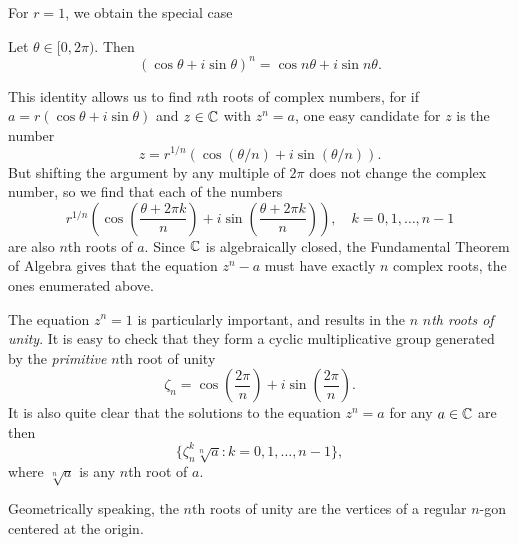 For $r=1$, we obtain the special case
\begin{proposition}
	\label{prop:de-moivre}
	Let $\theta \in [0,2\pi)$. Then $$(\cos \theta+i \sin \theta)^n=\cos n\theta+i \sin n \theta.$$
\end{proposition}

This identity allows us to find $n$th roots of complex numbers, for if $a=r(\cos \theta+i \sin \theta)$ and $z \in \mathbb C$ with $z^n=a$, one easy candidate for $z$ is the number $$z=r^{1/n}\left(\cos\left(\theta/n\right)+i\sin(\theta/n)\right).$$ But shifting the argument by any multiple of $2\pi$ does not change the complex number, so we find that each of the numbers $$r^{1/n}\left(\cos\left(\dfrac{\theta+2\pi k}{n}\right)+i\sin\left(\dfrac{\theta+2\pi k}{n}\right)\right), \quad k=0,1,\dots,n-1$$ are also $n$th roots of $a$. Since $\mathbb C$ is algebraically closed, the Fundamental Theorem of Algebra gives that the equation $z^n-a$ must have exactly $n$ complex roots, the ones enumerated above.

The equation $z^n=1$ is particularly important, and results in the $n$ \textit{$n$th roots of unity}. It is easy to check that they form a cyclic multiplicative group generated by the \textit{primitive} $n$th root of unity $$\zeta_n=\cos\left(\dfrac{2\pi}{n}\right)+i\sin\left(\dfrac{2\pi}{n}\right).$$ It is also quite clear that the solutions to the equation $z^n=a$ for any $a \in \mathbb C$ are then $$\{\zeta_n^k\sqrt[n]{a} \colon k=0,1,\dots,n-1\},$$ where $\sqrt[n]{a}$ is any $n$th root of $a$.

Geometrically speaking, the $n$th roots of unity are the vertices of a regular $n$-gon centered at the origin.

